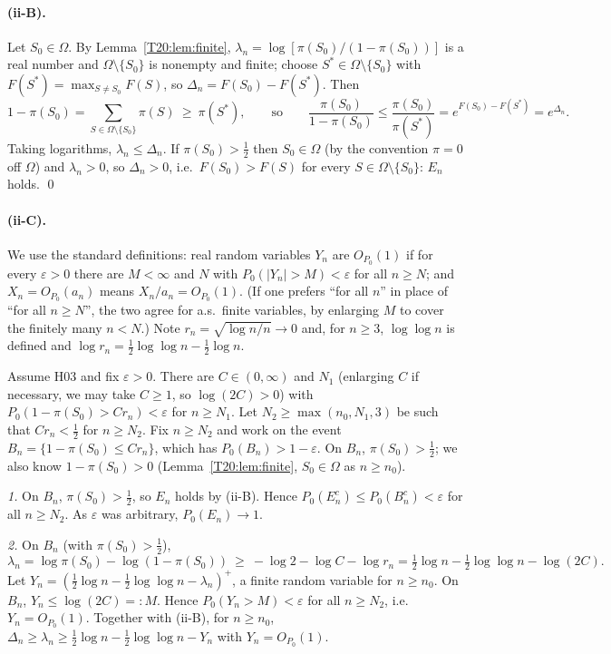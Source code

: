 \documentclass[11pt]{report}
\begin{document}
\paragraph{(ii-B).}
Let $S_0\in\Omega$. By Lemma~\ref{T20:lem:finite}, $\lambda_n=\log[\pi(S_0)/(1-\pi(S_0))]$ is a real number and $\Omega\setminus\{S_0\}$ is nonempty and finite; choose $S^*\in\Omega\setminus\{S_0\}$ with $F(S^*)=\max_{S\ne S_0}F(S)$, so $\Delta_n=F(S_0)-F(S^*)$. Then
\[
1-\pi(S_0)=\sum_{S\in\Omega\setminus\{S_0\}}\pi(S)\ \ge\ \pi(S^*),\qquad\text{so}\qquad
\frac{\pi(S_0)}{1-\pi(S_0)}\le\frac{\pi(S_0)}{\pi(S^*)}=e^{F(S_0)-F(S^*)}=e^{\Delta_n}.
\]
Taking logarithms, $\lambda_n\le\Delta_n$. If $\pi(S_0)>\frac12$ then $S_0\in\Omega$ (by the convention $\pi=0$ off $\Omega$) and $\lambda_n>0$, so $\Delta_n>0$, i.e.\ $F(S_0)>F(S)$ for every $S\in\Omega\setminus\{S_0\}$: $E_n$ holds. \qed

\paragraph{(ii-C).}
We use the standard definitions: real random variables $Y_n$ are $O_{P_0}(1)$ if for every $\varepsilon>0$ there are $M<\infty$ and $N$ with $P_0(|Y_n|>M)<\varepsilon$ for all $n\ge N$; and $X_n=O_{P_0}(a_n)$ means $X_n/a_n=O_{P_0}(1)$. (If one prefers ``for all $n$'' in place of ``for all $n\ge N$'', the two agree for a.s.\ finite variables, by enlarging $M$ to cover the finitely many $n<N$.) Note $r_n=\sqrt{\log n/n}\to0$ and, for $n\ge3$, $\log\log n$ is defined and $\log r_n=\tfrac12\log\log n-\tfrac12\log n$.

Assume H03 and fix $\varepsilon>0$. There are $C\in(0,\infty)$ and $N_1$ (enlarging $C$ if necessary, we may take $C\ge1$, so $\log(2C)>0$) with $P_0(1-\pi(S_0)>Cr_n)<\varepsilon$ for $n\ge N_1$. Let $N_2\ge\max(n_0,N_1,3)$ be such that $Cr_n<\frac12$ for $n\ge N_2$. Fix $n\ge N_2$ and work on the event $B_n=\{1-\pi(S_0)\le Cr_n\}$, which has $P_0(B_n)>1-\varepsilon$. On $B_n$, $\pi(S_0)>\frac12$; we also know $1-\pi(S_0)>0$ (Lemma~\ref{T20:lem:finite}, $S_0\in\Omega$ as $n\ge n_0$).

\emph{1.} On $B_n$, $\pi(S_0)>\frac12$, so $E_n$ holds by (ii-B). Hence $P_0(E_n^c)\le P_0(B_n^c)<\varepsilon$ for all $n\ge N_2$. As $\varepsilon$ was arbitrary, $P_0(E_n)\to1$.

\emph{2.} On $B_n$ (with $\pi(S_0)>\frac12$),
\[
\lambda_n=\log\pi(S_0)-\log(1-\pi(S_0))\ \ge\ -\log2-\log C-\log r_n=\tfrac12\log n-\tfrac12\log\log n-\log(2C).
\]
Let $Y_n=(\tfrac12\log n-\tfrac12\log\log n-\lambda_n)^+$, a finite random variable for $n\ge n_0$. On $B_n$, $Y_n\le\log(2C)=:M$. Hence $P_0(Y_n>M)<\varepsilon$ for all $n\ge N_2$, i.e.\ $Y_n=O_{P_0}(1)$. Together with (ii-B), for $n\ge n_0$,
$\Delta_n\ge\lambda_n\ge\tfrac12\log n-\tfrac12\log\log n-Y_n$ with $Y_n=O_{P_0}(1)$.
\end{document}
